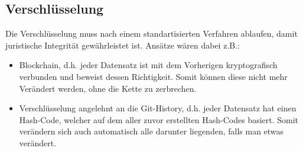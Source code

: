 \subsection{Verschlüsselung}
Die Verschlüsselung muss nach einem standartisierten Verfahren ablaufen, damit juristische Integrität gewährleistet ist. 
Ansätze wären dabei z.B.: \\
\begin{itemize}  
\item Blockchain, d.h. jeder Datensatz ist mit dem Vorherigen kryptografisch verbunden und beweist dessen Richtigkeit. 
Somit können diese nicht mehr Verändert werden, ohne die Kette zu zerbrechen.
\item Verschlüsselung angelehnt an die Git-History, d.h. jeder Datensatz hat einen Hash-Code, welcher auf dem aller zuvor erstellten
Hash-Codes basiert. Somit verändern sich auch automatisch alle darunter liegenden, falls man etwas verändert.
\end{itemize}